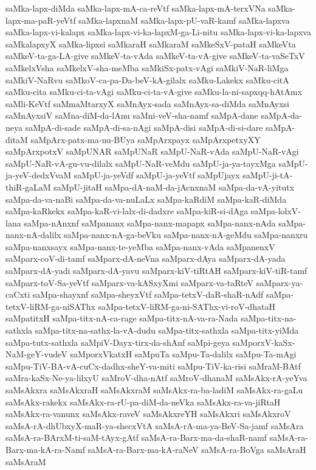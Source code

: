 {saMka-lapx-diMda
saMka-lapx-mA-ca-reVtf
saMka-lapx-mA-terxVNa
saMka-lapx-ma-paR-yeVtf
saMka-lapxnaM
saMka-lapx-pU-vaR-kamf
saMka-lapxva
saMka-lapx-vi-kalapx
saMka-lapx-vi-ka-lapxM-ga-Li-nitu
saMka-lapx-vi-ka-lapxva
saMkalapxyX
saMka-lipxsi
saMkaraH
saMkaraM
saMkeSxV-pataH
saMkeVta
saMkeV-ta-ga-LA-give
saMkeV-ta-vAda
saMkeV-ta-vA-give
saMkeV-ta-vaSeTxV
saMkelxVsha
saMkelxV-sha-meMba
saMkiSx-patx-vAgi
saMkiV-NaR-liMga
saMkiV-NaRvu
saMkoV-ca-pa-Da-beV-kA-gilalx
saMku-Lakekx
saMku-citA
saMku-cita
saMku-ci-ta-vAgi
saMku-ci-ta-vA-give
saMku-la-ni-sapxqq-hAtAmx
saMli-KeVtf
saMmaMtarxyX
saMnAyx-sada
saMnAyx-sa-diMda
saMnAyxsi
saMnAyxsiV
saMna-diM-da-lAnu
saMni-veV-sha-namf
saMpA-dane
saMpA-da-neya
saMpA-di-sade
saMpA-di-sa-nAgi
saMpA-disi
saMpA-di-si-dare
saMpA-ditaM
saMpArx-patx-ma-nu-BUya
saMpArxpayx
saMpArxpetxyXY
saMpArxpotxV
saMpUNAR
saMpUNaR
saMpU-NaR-vAda
saMpU-NaR-vAgi
saMpU-NaR-vA-gu-vu-dilalx
saMpU-NaR-veMdu
saMpU-ja-ya-tayxMga
saMpU-ja-yeV-dedxVvaM
saMpU-ja-yeVdf
saMpU-ja-yeVtf
saMpUjayx
saMpU-ji-tA-thiR-gaLaM
saMpU-jitaH
saMpa-dA-naM-da-jAcnxnaM
saMpa-da-vA-yitutx
saMpa-da-va-naBi
saMpa-da-va-nuLaLx
saMpa-kaRdiM
saMpa-kaR-diMda
saMpa-kaRkekx
saMpa-kaR-vi-lalx-di-dadxre
saMpa-kiR-si-dAga
saMpa-lolxV-lana
saMpa-nAnxnf
saMpananx
saMpa-nanx-mapapx
saMpa-nanx-nAda
saMpa-nanx-nA-dalilx
saMpa-nanx-nA-ga-beVku
saMpa-nanx-nA-geMdu
saMpa-nanxru
saMpa-nanxsayx
saMpa-nanx-te-yeMba
saMpa-nanx-vAda
saMpanenxV
saMparx-coV-di-tamf
saMparx-dA-neVna
saMparx-dAya
saMparx-dA-yada
saMparx-dA-yadi
saMparx-dA-yavu
saMparx-kiV-tiRtAH
saMparx-kiV-tiR-tamf
saMparx-toV-Sa-yeVtf
saMparx-va-kASxyXmi
saMparx-va-taRteV
saMparx-ya-caCxti
saMpa-shayxnf
saMpa-sheyxVtf
saMpa-tetxV-daR-shaR-nAdf
saMpa-tetxV-liRM-ga-niSAThx
saMpa-tetxV-liRM-ga-ni-SAThx-vi-roV-dhataH
saMpatitxH
saMpa-titx-nA-ca-rage
saMpa-titx-nA-va-ra-Nada
saMpa-titx-na-sathxla
saMpa-titx-na-sathx-la-vA-dudu
saMpa-titx-sathxla
saMpa-titx-yiMda
saMpa-tutx-sathxla
saMpiV-Dayx-tirx-da-shAnf
saMpi-geya
saMporxV-kaSx-NaM-geY-vudeV
saMporxVkatxH
saMpuTa
saMpu-Ta-dalilx
saMpu-Ta-mAgi
saMpu-TiV-BA-vA-cuCx-dadhx-sheY-va-miti
saMpu-TiV-ka-risi
saMraM-BAtf
saMra-kaSx-Ne-ya-lilxyU
saMroV-dha-nAtf
saMroV-dhanaM
saMsAkx-rA-yeYva
saMsAkxra
saMsAkxraH
saMsAkxraM
saMsAkx-ra-ba-ladiM
saMsAkx-ra-gaLu
saMsAkx-rakekx
saMsAkx-ra-rU-pa-diM-da-neVka
saMsAkx-ra-va-jiRtaH
saMsAkx-ra-vanunx
saMsAkx-raveV
saMsAkxreYH
saMsAkxri
saMsAkxroV
saMsA-rA-dhUbxyX-maR-ya-shecxVtA
saMsA-rA-ma-ya-BeV-Sa-jamf
saMsAra
saMsA-ra-BArxM-ti-saM-tAyx-gAtf
saMsA-ra-Barx-ma-da-shaR-namf
saMsA-ra-Barx-ma-kA-ra-Namf
saMsA-ra-Barx-ma-kA-raNeV
saMsA-ra-BoVga
saMsAraH
saMsAraM
}
